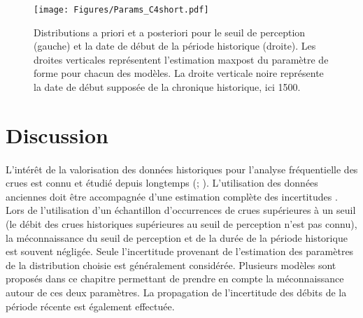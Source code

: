\documentclass[11pt]{article}
\begin{document}
	\begin{figure}[h]
		\centering
		\texttt{[image: Figures/Params\_C4short.pdf]}	
		\caption{Distributions a priori et a posteriori pour le seuil de perception (gauche) et la date de début de la période historique (droite). Les droites verticales représentent l'estimation maxpost du paramètre de forme pour chacun des modèles. La droite verticale noire représente la date de début supposée de la chronique historique, ici 1500.}
		\label{fig:Params_C4short}
	\end{figure}
	
	\FloatBarrier
	
	\section{Discussion}
	\label{sec:Discussion}
	\paragraph{} L'intérêt de la valorisation des données historiques pour l'analyse fréquentielle des crues est connu et étudié depuis longtemps (\citet{benson_use_1950}; \citet{stedinger_flood_1986}). L'utilisation des données anciennes doit être accompagnée d'une estimation complète des incertitudes \citep{kjeldsen_documentary_2014}. Lors de l'utilisation d'un échantillon d'occurrences de crues supérieures à un seuil (le débit des crues historiques supérieures au seuil de perception n'est pas connu), la méconnaissance du seuil de perception et de la durée de la période historique est souvent négligée. Seule l'incertitude provenant de l'estimation des paramètres de la distribution choisie est généralement considérée. Plusieurs modèles sont proposés dans ce chapitre permettant de prendre en compte la méconnaissance autour de ces deux paramètres. La propagation de l'incertitude des débits de la période récente est également effectuée. 
	
\end{document}
